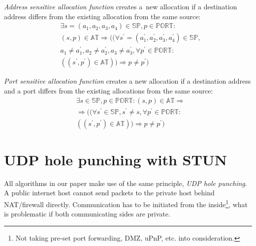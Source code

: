 \documentclass{acm_proc_article-sp}
\begin{document}
\emph{Address sensitive allocation function} creates a~new allocation if a destination address differs from the existing allocation 
from the same source:
\begin{align*}
& \exists s=(a_1,a_2,a_3,a_4) \in \mathbb{SP}, p \in \mathbb{PORT}: \\
& (s, p) \in \mathbb{AT} \Rightarrow ((\forall s^{\prime}=(a_1^{\prime},a_2^{\prime},a_3^{\prime},a_4^{\prime}) \in \mathbb{SP}, \\
& a_1 \neq a_1^{\prime}, a_2 \neq a_2^{\prime}, a_3 \neq a_3^{\prime}, \forall p^{\prime} \in \mathbb{PORT}: \\
& ((s^{\prime}, p^{\prime}) \in \mathbb{AT})) \Rightarrow p \neq p^{\prime})
\end{align*}

\emph{Port sensitive allocation function} creates a new allocation if a destination address and a port differs from the existing
allocations from the same source:
\begin{align*}
& \exists s \in \mathbb{SP}, p \in \mathbb{PORT}: (s, p) \in \mathbb{AT} \Rightarrow \\
& \Rightarrow ((\forall s^{\prime} \in \mathbb{SP}, s^{\prime} \neq s , \forall p^{\prime} \in \mathbb{PORT}: \\
& ((s^{\prime}, p^{\prime}) \in \mathbb{AT})) \Rightarrow p \neq p^{\prime})
\end{align*}
% 

\section{UDP hole punching with STUN}
All algorithms in our paper make use of the same principle, \emph{UDP hole punching}. 
A public internet host cannot send packets to the private host behind NAT/firewall directly. 
Communication has to be initiated from the inside\footnote{Not taking
pre-set port forwarding, DMZ, uPnP, etc. into consideration. }, what is problematic if both
communicating sides are private.
\end{document}
